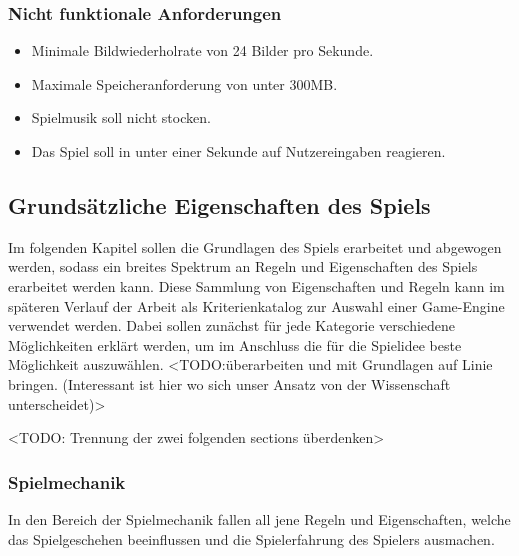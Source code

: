 	\subsubsection{Nicht funktionale Anforderungen}
		\begin{itemize}
			\item{ Minimale Bildwiederholrate von 24 Bilder pro Sekunde. }
			\item{ Maximale Speicheranforderung von unter 300MB. }
			\item{ Spielmusik soll nicht stocken. }
			\item{ Das Spiel soll in unter einer Sekunde auf Nutzereingaben reagieren. }
		\end{itemize}

\subsection{Grundsätzliche Eigenschaften des Spiels}
	Im folgenden Kapitel sollen die Grundlagen des Spiels erarbeitet und abgewogen werden, sodass ein breites Spektrum an Regeln und Eigenschaften des Spiels erarbeitet werden kann. Diese Sammlung von Eigenschaften und Regeln kann im späteren Verlauf der Arbeit als Kriterienkatalog zur Auswahl einer Game-Engine verwendet werden. Dabei sollen zunächst für jede Kategorie verschiedene Möglichkeiten erklärt werden, um im Anschluss die für die Spielidee beste Möglichkeit auszuwählen.
	<TODO:überarbeiten und mit Grundlagen auf Linie bringen. (Interessant ist hier wo sich unser Ansatz von der Wissenschaft unterscheidet)>

	<TODO: Trennung der zwei folgenden sections überdenken>
	\subsubsection{Spielmechanik}\label{sssec:spielmechanik}
	In den Bereich der Spielmechanik fallen all jene Regeln und Eigenschaften, welche das Spielgeschehen beeinflussen und die Spielerfahrung des Spielers ausmachen.

